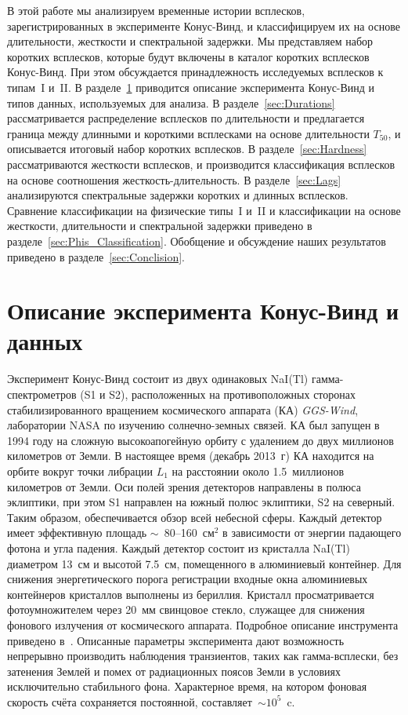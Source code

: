 В этой работе мы анализируем временные истории всплесков, зарегистрированных в 
эксперименте Конус-Винд, и классифицируем их на основе длительности, жесткости и 
спектральной задержки. Мы представляем набор коротких всплесков, которые будут 
включены в каталог коротких всплесков Конус-Винд. При этом обсуждается принадлежность 
исследуемых всплесков к типам~I и~II. В разделе~\ref{sec:KW_Description} приводится 
описание эксперимента Конус-Винд и типов данных, используемых для анализа. 
В разделе~\ref{sec:Durations} рассматривается распределение всплесков по длительности 
и предлагается граница между длинными и короткими всплесками на основе 
длительности $T_{50}$, и описывается итоговый набор коротких всплесков. 
В разделе~\ref{sec:Hardness} рассматриваются жесткости всплесков, и производится 
классификация всплесков на основе соотношения жесткость-длительность. 
В разделе~\ref{sec:Lags} анализируются спектральные задержки коротких и длинных всплесков. 
Сравнение классификации на физические типы~I и~II и классификации на основе жесткости, 
длительности и спектральной задержки приведено в разделе~\ref{sec:Phis_Classification}. 
Обобщение и обсуждение наших результатов приведено в разделе~\ref{sec:Conclision}.  

\section{Описание эксперимента Конус-Винд и данных}\label{sec:KW_Description}
Эксперимент Конус-Винд состоит из двух одинаковых NaI(Tl) гамма-спектрометров (S1 и S2), 
расположенных на противоположных сторонах стабилизированного вращением космического 
аппарата (КА) \textit{GGS-Wind}, лаборатории NASA по изучению солнечно-земных связей. 
КА был запущен в 1994 году на сложную высокоапогейную орбиту с удалением до двух 
миллионов километров от Земли. В настоящее время (декабрь 2013~г) КА находится на 
орбите вокруг точки либрации $L_1$ на расстоянии около 1.5~миллионов километров 
от Земли. Оси полей зрения детекторов направлены в полюса эклиптики, при этом S1 
направлен на южный полюс эклиптики, S2 на северный. Таким образом, обеспечивается 
обзор всей небесной сферы. Каждый детектор имеет эффективную площадь $\sim$~80--160~см$^2$ 
в зависимости от энергии падающего фотона и угла падения. Каждый детектор состоит 
из кристалла NaI(Tl) диаметром 13~см и высотой 7.5~см, помещенного в алюминиевый 
контейнер. Для снижения энергетического порога регистрации входные окна алюминиевых 
контейнеров кристаллов выполнены из бериллия. Кристалл просматривается  
фотоумножителем через 20~мм свинцовое стекло, служащее для снижения фонового 
излучения от космического аппарата. Подробное описание инструмента приведено 
в~\citep{Aptekar_1995}. Описанные параметры эксперимента дают возможность 
непрерывно производить наблюдения транзиентов, таких как гамма-всплески, без 
затенения Землей и помех от радиационных поясов Земли в условиях исключительно 
стабильного фона. Характерное время, на котором фоновая скорость счёта сохраняется 
постоянной, составляет~$\sim 10^{5}$~c. 

